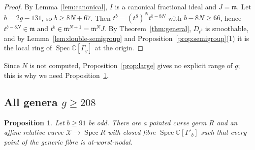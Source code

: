 \documentclass{amsart}
\newtheorem{proposition}[theorem]{Proposition}
\theoremstyle{definition}
\theoremstyle{remark}
\numberwithin{equation}{section}
\newcommand{\C}{\mathbb{C}}
\newcommand{\m}{\mathfrak{m}}
\DeclareMathOperator{\Spec}{Spec}
\begin{document}
\begin{proof}
By Lemma~\ref{lem:canonical}, $I$ is a canonical fractional ideal and $J=\m$. Let $b=2g-131$, so $b\ge8N+67$. Then $t^b=(t^8)^Nt^{b-8N}$ with $b-8N\ge66$, hence $t^{b-8N}\in\m$ and $t^b\in\m^{N+1}=\m^NJ$. By Theorem~\ref{thm:general}, $D_{t^b}$ is smoothable, and by Lemma~\ref{lem:double-semigroup} and Proposition~\ref{prop:semigroup}(1) it is the local ring of $\Spec\C[\Gamma_g]$ at the origin.
\end{proof}

Since $N$ is not computed, Proposition~\ref{prop:large} gives no explicit range of $g$; this is why we need Proposition~\ref{prop:explicit}.

\subsection{\texorpdfstring{All genera $g\ge208$}{All genera g >= 208}}

\begin{proposition}\label{prop:explicit}
Let $b\ge91$ be odd. There are a pointed curve germ $R$ and an affine relative curve $\mathcal X\to\Spec R$ with closed fibre $\Spec\C[\Gamma'_b]$ such that every point of the generic fibre is at-worst-nodal.
\end{proposition}
\end{document}
